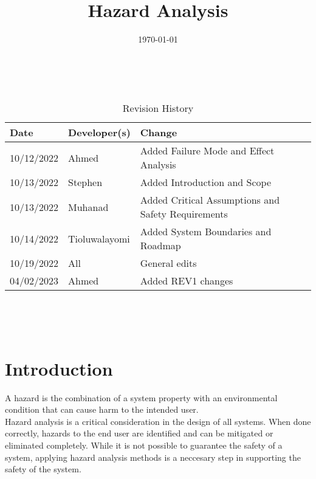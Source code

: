 \documentclass[12pt]{article}
\title{Hazard Analysis \\ \progname}
\author{\authname}
\date{\today}
\begin{document}
\maketitle
\thispagestyle{empty}

~\newpage


\begin{table}[hp]
\caption{Revision History} \label{TblRevisionHistory}
\begin{tabularx}{\textwidth}{llX}
\toprule
\textbf{Date} & \textbf{Developer(s)} & \textbf{Change}\\
\midrule
10/12/2022 & Ahmed & Added Failure Mode and Effect Analysis\\
10/13/2022 & Stephen & Added Introduction and Scope\\
10/13/2022 & Muhanad & Added Critical Assumptions and Safety Requirements\\
10/14/2022 & Tioluwalayomi & Added System Boundaries and Roadmap\\
10/19/2022 & All & General edits\\
04/02/2023 & Ahmed & Added REV1 changes\\
\bottomrule
\end{tabularx}
\end{table}

\listoftables

~\newpage

\tableofcontents



~\newpage



\section{Introduction}

A hazard is the combination of a system property with an environmental condition that can cause harm to the intended user.\\

Hazard analysis is a critical consideration in the design of all systems. When done correctly, hazards to the end user are identified and can be mitigated or eliminated completely. While it is not possible to guarantee the safety of a system, applying hazard analysis methods is a neccesary step in supporting the safety of the system. \\
\end{document}
